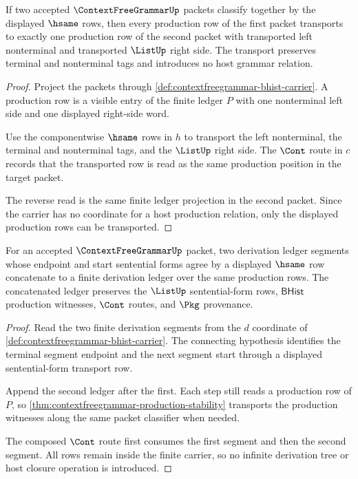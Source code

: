 \begin{theorem}
\label{thm:contextfreegrammar-production-stability}
If two accepted $\ContextFreeGrammarUp$ packets classify together by the
displayed $\hsame$ rows, then every production row of the first packet
transports to exactly one production row of the second packet with transported
left nonterminal and transported $\ListUp$ right side. The transport preserves
terminal and nonterminal tags and introduces no host grammar relation.
\end{theorem}
\begin{proof}
Project the packets through
\autoref{def:contextfreegrammar-bhist-carrier}. A production row is a visible
entry of the finite ledger $P$ with one nonterminal left side and one displayed
right-side word.

Use the componentwise $\hsame$ rows in $h$ to transport the left nonterminal,
the terminal and nonterminal tags, and the $\ListUp$ right side. The $\Cont$
route in $c$ records that the transported row is read as the same production
position in the target packet.

The reverse read is the same finite ledger projection in the second packet.
Since the carrier has no coordinate for a host production relation, only the
displayed production rows can be transported.
\end{proof}

\begin{theorem}
\label{thm:contextfreegrammar-derivation-concatenation}
For an accepted $\ContextFreeGrammarUp$ packet, two derivation ledger segments
whose endpoint and start sentential forms agree by a displayed $\hsame$ row
concatenate to a finite derivation ledger over the same production rows. The
concatenated ledger preserves the $\ListUp$ sentential-form rows,
$\mathsf{BHist}$ production witnesses, $\Cont$ routes, and $\Pkg$ provenance.
\end{theorem}
\begin{proof}
Read the two finite derivation segments from the $d$ coordinate of
\autoref{def:contextfreegrammar-bhist-carrier}. The connecting hypothesis
identifies the terminal segment endpoint and the next segment start through a
displayed sentential-form transport row.

Append the second ledger after the first. Each step still reads a production
row of $P$, so \autoref{thm:contextfreegrammar-production-stability}
transports the production witnesses along the same packet classifier when
needed.

The composed $\Cont$ route first consumes the first segment and then the
second segment. All rows remain inside the finite carrier, so no infinite
derivation tree or host closure operation is introduced.
\end{proof}

